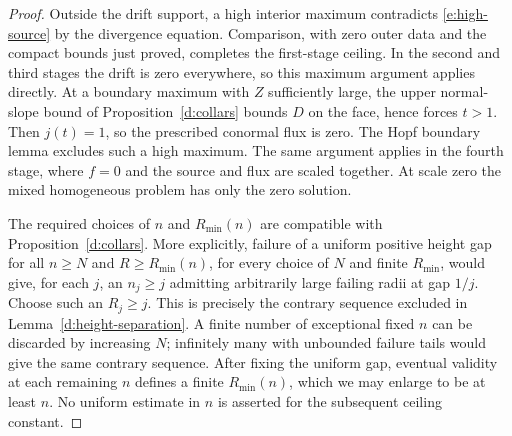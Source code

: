 \begin{proof}
Outside the drift support, a high interior maximum contradicts
\eqref{e:high-source} by the divergence equation.  Comparison, with
zero outer data and the compact bounds just proved, completes the
first-stage ceiling.  In the second and third stages the drift is zero
everywhere, so this maximum argument applies directly.  At a boundary
maximum with $Z$ sufficiently large, the upper normal-slope bound of
Proposition~\ref{d:collars} bounds $D$ on the face, hence forces
$t>1$.  Then $j(t)=1$, so the prescribed conormal flux is zero.
The Hopf boundary lemma excludes such a high maximum.  The same
argument applies in the fourth stage, where $f=0$ and the source and
flux are scaled together.  At scale zero the mixed homogeneous
problem has only the zero solution.

The required choices of $n$ and $R_{\min}(n)$ are compatible with
Proposition~\ref{d:collars}.  More explicitly, failure of a uniform
positive height gap for all $n\ge N$ and $R\ge R_{\min}(n)$,
for every choice of $N$ and finite $R_{\min}$, would give, for each
$j$, an $n_j\ge j$ admitting arbitrarily large failing radii at gap
$1/j$.  Choose such an $R_j\ge j$.  This is precisely the contrary
sequence excluded in Lemma~\ref{d:height-separation}.  A finite
number of exceptional fixed $n$ can be discarded by increasing $N$;
infinitely many with unbounded failure tails would give the same
contrary sequence.  After fixing the uniform gap, eventual validity
at each remaining $n$ defines a finite $R_{\min}(n)$, which we may
enlarge to be at least $n$.  No uniform estimate in $n$ is asserted
for the subsequent ceiling constant.
\end{proof}
